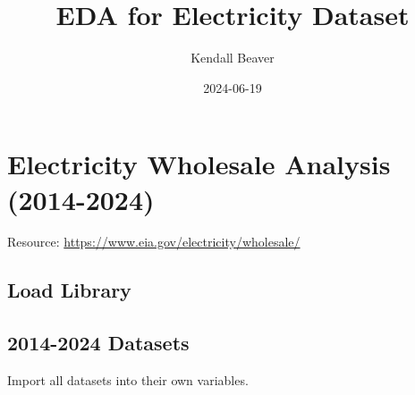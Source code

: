 \documentclass[
]{article}
\title{EDA for Electricity Dataset}
\author{Kendall Beaver}
\date{2024-06-19}
\begin{document}
\maketitle

\section{Electricity Wholesale Analysis
(2014-2024)}\label{electricity-wholesale-analysis-2014-2024}

Resource: \url{https://www.eia.gov/electricity/wholesale/}

\subsection{Load Library}\label{load-library}

\subsection{2014-2024 Datasets}\label{datasets}

Import all datasets into their own variables.
\end{document}
